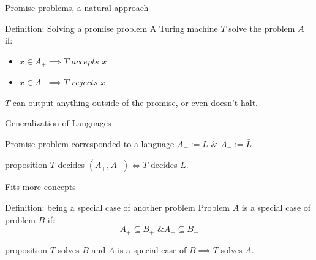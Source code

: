         \begin{frame}{Promise problems, a natural approach}
            \begin{block}{Definition: Solving a promise problem}
                A Turing machine $T$ solve the problem $A$ if:
                \begin{itemize}
                    \item $x \in A_+ \implies T$ $accepts$ $x$
                    \item $x \in A_- \implies T$ $rejects$ $x$
                \end{itemize}    
            \end{block}
            \pause
            \begin{alertblock}{}
                $T$ can output anything outside of the promise, or even doesn't halt.
            \end{alertblock}
        \end{frame}
        
        \begin{frame}{Generalization of Languages}
            \begin{block}{Promise problem corresponded to a language}
                $A_+ := L$ \& $A_-:= \bar{L}$
            \end{block}
            \pause
            \begin{block}{proposition}
                $T$ decides $(A_+,A_-) \iff T$ decides $L$.
            \end{block}
        \end{frame}

        \begin{frame}{Fits more concepts}
            \begin{block}{Definition: being a special case of another problem}
                Problem $A$ is a special case of problem $B$ if:
                $$A_+ \subseteq B_+ \text{ \& } A_- \subseteq B_-$$
            \end{block}    
            \pause
            \begin{block}{proposition}
                $T$ solves $B$ and $A$ is a special case of $B \implies T$ solves
                $A$.
            \end{block}
        \end{frame}
        
